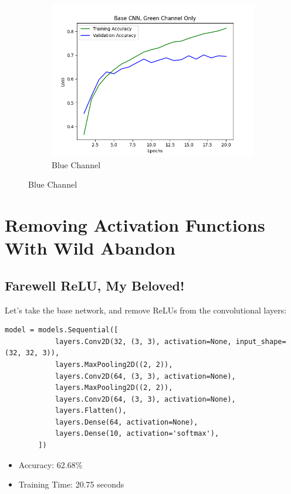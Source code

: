 \documentclass{article}
\begin{document}
\begin{figure}
\begin{subfigure}[h]{0.5\linewidth}
            \includegraphics[width=\linewidth]{Base CNN, Green Channel Only}
            \caption{Blue Channel}
        \end{subfigure}\label{fig:figure}%
    \end{figure}

    \section{Removing Activation Functions With Wild Abandon}\label{sec:wild-abandon}

    \subsection{Farewell ReLU, My Beloved!}\label{subsec:farewell-my-beloved-relu!}

    Let's take the base network, and remove ReLUs from the convolutional layers:

    \begin{lstlisting}[label={lst:no_relu}]
        model = models.Sequential([
            layers.Conv2D(32, (3, 3), activation=None, input_shape=(32, 32, 3)),
            layers.MaxPooling2D((2, 2)),
            layers.Conv2D(64, (3, 3), activation=None),
            layers.MaxPooling2D((2, 2)),
            layers.Conv2D(64, (3, 3), activation=None),
            layers.Flatten(),
            layers.Dense(64, activation=None),
            layers.Dense(10, activation='softmax'),
        ])
    \end{lstlisting}

    \begin{itemize}
        \item Accuracy: 62.68\%
        \item Training Time: 20.75 seconds
    \end{itemize}
\end{document}
